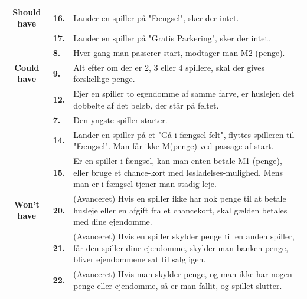\begin{center}
\begin{tabular}{ || c | l | p{11.5cm} ||}
    \cline{2-3}
    \textbf{Should have}
    &
    \textbf{16.}
    &
    Lander en spiller på "Fængsel", sker der intet. \\
    
    \cline{2-3}
    &
    \textbf{17.}
    &
    Lander en spiller på "Gratis Parkering", sker der intet. \\
    \hline
    \hline
     &
     \textbf{8.}
     &
     Hver gang man passerer start, modtager man M2 (penge). \\
     
     \cline{2-3}
     \textbf{Could have}
     &
     \textbf{9.}
     &
     Alt efter om der er 2, 3 eller 4 spillere, skal der gives forskellige penge. \\

     \cline{2-3}
     &
     \textbf{12.}
     &
     Ejer en spiller to egendomme af samme farve, er huslejen det dobbelte af det beløb, der står på feltet. \\

    \hline
    \hline
    &
    \textbf{7.}
    &
    Den yngste spiller starter. \\
    
    \cline{2-3}
    &
    \textbf{14.}
    &
    Lander en spiller på et "Gå i fængsel-felt", flyttes spilleren til "Fængsel". Man får ikke M(penge) ved passage af start. \\

    \cline{2-3}
    &
    \textbf{15.}
    &
    Er en spiller i fængsel, kan man enten betale M1 (penge), eller bruge et chance-kort med løsladelses-mulighed. Mens man er i fængsel tjener man stadig leje. \\

    \cline{2-3}
    \textbf{Won't have}
    &
    \textbf{20.}
    &
    (Avanceret) Hvis en spiller ikke har nok penge til at betale husleje eller en afgift fra et chancekort, skal gælden betales med dine ejendomme.    \\

    \cline{2-3}
    &
    \textbf{21.}
    &
    (Avanceret) Hvis en spiller skylder penge til en anden spiller, får den spiller dine ejendomme, skylder man banken penge, bliver ejendommene sat til salg igen.    \\

    \cline{2-3}
    &
    \textbf{22.}
    &
    (Avanceret) Hvis man skylder penge, og man ikke har nogen penge eller ejendomme, så er man fallit, og spillet slutter.
    \\
    \hline
    \hline
    \end{tabular}
\end{center}

